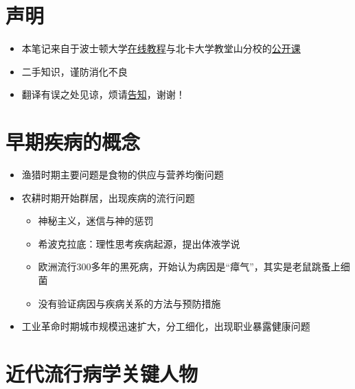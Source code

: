\documentclass[]{book}
\providecommand{\tightlist}{%
  \setlength{\itemsep}{0pt}\setlength{\parskip}{0pt}}
\begin{document}
\section{声明}

\begin{itemize}
\tightlist
\item
  本笔记来自于波士顿大学\href{http://sphweb.bumc.bu.edu/otlt/MPH-Modules/Modules_Menu.html}{在线教程}与北卡大学教堂山分校的\href{https://www.coursera.org/learn/epidemiology/outline}{公开课}
\item
  二手知识，谨防消化不良
\item
  翻译有误之处见谅，烦请\href{mailto:yufreecas@gmail.com}{告知}，谢谢！
\end{itemize}

\section{早期疾病的概念}

\begin{itemize}
\tightlist
\item
  渔猎时期主要问题是食物的供应与营养均衡问题
\item
  农耕时期开始群居，出现疾病的流行问题

  \begin{itemize}
  \tightlist
  \item
    神秘主义，迷信与神的惩罚
  \item
    希波克拉底：理性思考疾病起源，提出体液学说
  \item
    欧洲流行300多年的黑死病，开始认为病因是``瘴气''，其实是老鼠跳蚤上细菌
  \item
    没有验证病因与疾病关系的方法与预防措施
  \end{itemize}
\item
  工业革命时期城市规模迅速扩大，分工细化，出现职业暴露健康问题
\end{itemize}

\section{近代流行病学关键人物}
\end{document}
